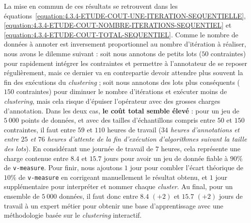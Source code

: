 			La mise en commun de ces résultats se retrouvent dans les équations~\ref{equation:4.3.4-ETUDE-COUT-UNE-ITERATION-SEQUENTIELLE}, \ref{equation:4.3.4-ETUDE-COUT-NOMBRE-ITERATIONS-SEQUENTIEL} et \ref{equation:4.3.4-ETUDE-COUT-TOTAL-SEQUENTIEL}.
			Comme le nombre de données à annoter est inversement proportionnel au nombre d'itération à réaliser, nous avons le dilemme suivant : soit nous annotons de petits lots ($50$ contraintes) pour rapidement intégrer les contraintes et permettre à l'annotateur de se reposer régulièrement, mais ce dernier va en contrepartie devoir attendre plus souvent la fin des exécutions du \textit{clustering} ; soit nous annotons des lots plus conséquents ($150$ contraintes) pour diminuer le nombre d'itérations et exécuter moins de \textit{clustering}, mais cela risque d'épuiser l'opérateur avec des grosses charges d'annotation.
			Dans les deux cas, \textbf{le coût total semble élevé} : pour un jeu de $5~000$ points de données, et avec des tailles d'échantillons compris entre $50$ et $150$ contraintes, il faut entre $59$ et $110$ heures de travail (\textit{$34$ heures d'annotations et entre $25$ et $76$ heures d'attente de la fin d'exécution d'algorithmes suivant la taille des lots}).
			En considérant une journée de travail de $7$ heures, cela représente une charge contenue entre $8.4$ et $15.7$ jours pour avoir un jeu de donnée fiable à $90$\% de \texttt{v-measure}.
			Pour finir, nous ajoutons $1$ jour pour combler l'écart théorique de $10$\% de \texttt{v-measure} en corrigeant manuellement le résultat obtenu, et $1$ jour supplémentaire pour interpréter et nommer chaque \textit{cluster}.
			Au final, pour un ensemble de $5~000$ données, il faut donc entre $8.4$ {\footnotesize $(+2)$} et $15.7$ {\footnotesize $(+2)$} jours de travail à un expert métier pour obtenir une base d'apprentissage avec une méthodologie basée sur le \textit{clustering} interactif.
			

